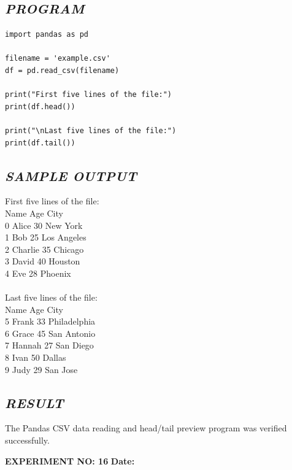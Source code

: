 \documentclass[11pt,a4paper]{article}
\begin{document}
\subsection*{\textit{PROGRAM}}
\begin{lstlisting}[style=pythonstyle]
import pandas as pd 
 
filename = 'example.csv' 
df = pd.read_csv(filename) 
 
print("First five lines of the file:") 
print(df.head()) 
 
print("\nLast five lines of the file:") 
print(df.tail())
\end{lstlisting}

\subsection*{\textit{SAMPLE OUTPUT}}
\begin{tcolorbox}[colback=black!85,colframe=navyblue,title=\textbf{Terminal Output},coltitle=white,fonttitle=\bfseries\small]
\small\ttfamily\color{green!30!white}
First five lines of the file:\\
      Name  Age         City\\
0    Alice   30     New York\\
1      Bob   25  Los Angeles\\
2  Charlie   35      Chicago\\
3    David   40      Houston\\
4      Eve   28      Phoenix\\
\\
Last five lines of the file:\\
     Name  Age         City\\
5   Frank   33  Philadelphia\\
6   Grace   45   San Antonio\\
7  Hannah   27     San Diego\\
8    Ivan   50        Dallas\\
9    Judy   29      San Jose
\end{tcolorbox}

\subsection*{\textit{RESULT}}
The Pandas CSV data reading and head/tail preview program was verified successfully.

\newpage

\noindent
\textbf{\large EXPERIMENT NO: 16} \hfill \textbf{\large Date: \underline{\hspace{3cm}}}
\end{document}
